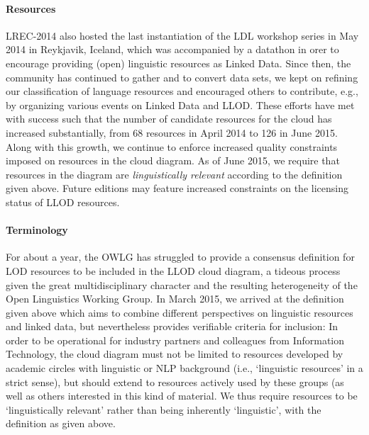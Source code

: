 \paragraph{Resources} 
LREC-2014 also hosted the last instantiation of the LDL workshop series in May 2014 in Reykjavik, Iceland, which was accompanied by a datathon in orer to encourage providing (open) linguistic resources as Linked Data. 
Since then, the community has continued to gather and to convert data sets, we kept on refining our classification of language resources and encouraged others to contribute, e.g., by organizing various events on Linked Data and LLOD.
These efforts have met with success such that the number of candidate resources for the cloud has increased substantially, from 68 resources in April 2014 to 126 in June 2015. Along with this growth, we continue to enforce increased quality constraints imposed on resources in the cloud diagram. As of June 2015, we require that resources in the diagram are \emph{linguistically relevant} according to the definition given above. 
Future editions may feature increased constraints on the licensing status of LLOD resources.

\paragraph{Terminology}
For about a year, the OWLG has struggled to provide a consensus definition for LOD resources to be included in the LLOD cloud diagram, a tideous process given the great multidisciplinary character and the resulting heterogeneity of the Open Linguistics Working Group. 
In March 2015, we arrived at the definition given above which aims to combine different perspectives on linguistic resources and linked data, but nevertheless provides verifiable criteria for inclusion:
In order to be operational for industry partners and colleagues from Information Technology, the cloud diagram must not be limited to resources developed by academic circles with linguistic or NLP background (i.e., `linguistic resources' in a strict sense), but should extend to resources actively used by these groups (as well as others interested in this kind of material. We thus require resources to be `linguistically relevant' rather than being inherently `linguistic', with the definition as given above. 

